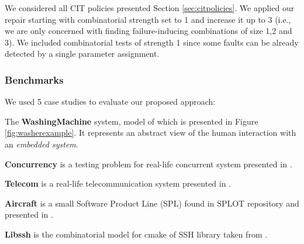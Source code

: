 \begin{tikzborder}{\cite{Gargantini16:validation}}
\begin{tikzborder}{\cite{gargantini_combinatorial_2017}}
We considered all CIT policies presented Section \ref{sec:citpolicies}. We applied our repair starting with combinatorial strength set to 1 and increase it up to 3 (i.e., we are only concerned with finding failure-inducing combinations of size 1,2 and 3). We included combinatorial tests of strength 1 since some faults can be already detected by a single parameter assignment.
\be

\subsubsection{Benchmarks}

\bb We used 5 case studies to evaluate our proposed approach:

\begin{asparaenum}
	
	\item The \textbf{WashingMachine} system, model of which is presented in Figure \ref{fig:washerexample}. It represents an abstract view of the human interaction with an \emph{embedded system}.  
	
	\item \textbf{Concurrency} is a testing problem for real-life concurrent system presented in \cite{segall_using_2011}.
	
	\item \textbf{Telecom} is a real-life telecommunication system presented in \cite{segall_using_2011}.
	
	\item \textbf{Aircraft} is a small Software Product Line (SPL) found in SPLOT repository and presented in \cite{Voelter:2009}.
	
	\item \textbf{Libssh} is the combinatorial model for cmake of SSH library taken from \cite{icst2016}.
		
\end{asparaenum}
\be


\end{tikzborder}
\end{tikzborder}
